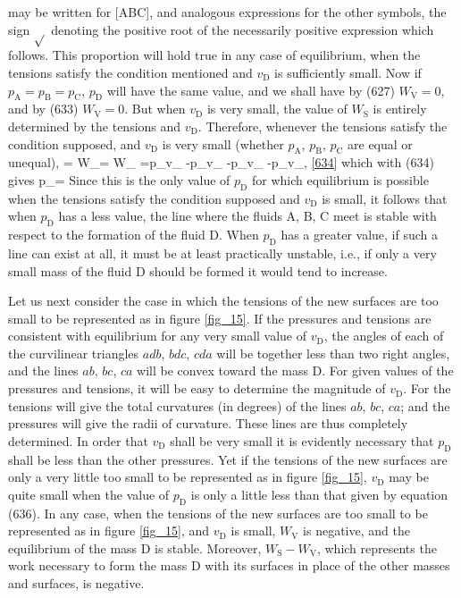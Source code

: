 \documentclass[12pt]{memoir}
\begin{document}
may be written for [ABC], and analogous expressions for the other symbols, the sign $\sqrt{}$ denoting the positive root of the necessarily positive expression which follows. This proportion will hold true in any case of equilibrium, when the tensions satisfy the condition mentioned and $v_\text{D}$ is sufficiently small. Now if $p_\text{A}=p_\text{B}=p_\text{C}$, $p_\text{D}$ will have the same value, and we shall have by (627) $W_\text{V}=0$, and by (633) $W_\text{V} =0$. But when $v_\text{D}$ is very small, the value of $W_\text{S}$ is entirely determined by the tensions and $v_\text{D}$. Therefore, whenever the tensions satisfy the condition supposed, and $v_\text{D}$ is very small (whether $p_\text{A}$, $p_\text{B}$, $p_\text{C}$ are equal or unequal),
 = W_= W_ =p_v_ -p_v_ -p_v_ -p_v_,          \ref{634} \eqe
which with (634) gives
\eqs p_=\label{635} \eqe
Since this is the only value of $p_\text{D}$ for which equilibrium is possible when the tensions satisfy the condition supposed and $v_\text{D}$ is small, it follows that when $p_\text{D}$ has a less value, the line where the fluids A, B, C meet is stable with respect to the formation of the fluid D. When $p_\text{D}$ has a greater value, if such a line can exist at all, it must be at least practically unstable, i.e., if only a very small mass of the fluid D should be formed it would tend to increase.

Let us next consider the case in which the tensions of the new surfaces are too small to be represented as in figure \ref{fig_15}. If the pressures and tensions are consistent with equilibrium for any very small value of $v_\text{D}$, the angles of each of the curvilinear triangles $adb$, $bdc$, $cda$ will be together less than two right angles, and the lines $ab$, $bc$, $ca$ will be convex toward the mass D. For given values of the pressures and tensions, it will be easy to determine the magnitude of $v_\text{D}$. For the tensions will give the total curvatures (in degrees) of the lines $ab$, $bc$, $ca$; and the pressures will give the radii of curvature. These lines are thus completely determined. In order that $v_\text{D}$ shall be very small it is evidently necessary that $p_\text{D}$ shall be less than the other pressures. Yet if the tensions of the new surfaces are only a very little too small to be represented as in figure \ref{fig_15}, $v_\text{D}$ may be quite small when the value of $p_\text{D}$ is only a little less than that given by equation (636). In any case, when the tensions of the new surfaces are too small to be represented as in figure \ref{fig_15}, and $v_\text{D}$ is small, $W_\text{V}$ is negative, and the equilibrium of the mass D is stable. Moreover, $W_\text{S}-W_\text{V}$, which represents the work necessary to form the mass D with its surfaces in place of the other masses and surfaces, is negative.
\end{document}
